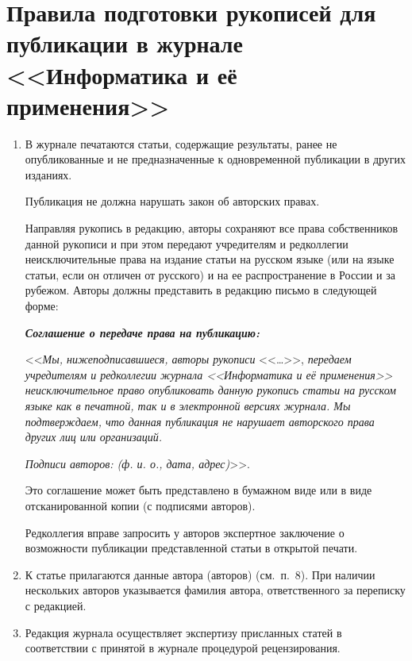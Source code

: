 \vspace*{-60pt} %
{ %
\section*{Правила подготовки рукописей  для публикации в журнале
<<Информатика и её применения>>}

\thispagestyle{empty}

\noindent
\begin{enumerate}[1.]
\item В журнале печатаются статьи, содержащие результаты, ранее не опубликованные и 
не предназначенные к одновременной публикации в других изданиях. 
 
Публикация не должна нарушать закон об авторских правах. 
 
Направляя рукопись в редакцию, авторы сохраняют все права собственников данной 
рукописи и при этом передают учредителям и редколлегии неисключительные права на 
издание статьи на русском языке (или на языке статьи, если он отличен от русского) и на 
ее распространение в России и за рубежом. Авторы должны представить в редакцию 
письмо в следующей форме: 


{\bfseries\textit{Соглашение о передаче права на публикацию:}}

<<\textit{Мы, нижеподписавшиеся, авторы рукописи} <<\ldots>>, 
\textit{передаем учредителям и редколлегии журнала <<Информатика и её 
применения>> неисключительное право опубликовать данную рукопись 
статьи на русском языке как в печатной, так и в электронной версиях 
журнала. Мы подтверждаем, что данная публикация не нарушает 
авторского права других лиц или организаций. }
 
\textit{Подписи авторов: (ф. и. о., дата, адрес)}>>.  
 
Это соглашение может быть представлено в бумажном виде или в виде 
отсканированной копии (с подписями авторов).  
 
Редколлегия вправе запросить у авторов экспертное заключение о 
возможности публикации пред\-став\-лен\-ной статьи в открытой печати. 

\item К статье прилагаются данные автора (авторов) (см.\ п.~8). При наличии нескольких 
авторов указывается фамилия автора, ответственного за переписку с редакцией. 

\item Редакция журнала осуществляет экспертизу присланных статей в соответствии с 
принятой в журнале процедурой рецензирования.


\end{enumerate}}

